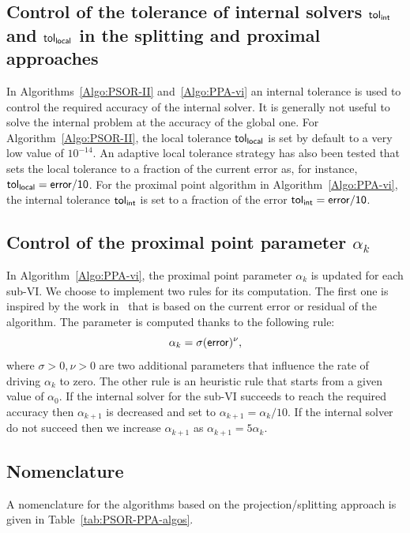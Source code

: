 \subsection{Control of the tolerance of internal solvers $\sf tol_{{int}}$ and $\sf tol_{{local}}$ in the splitting and proximal approaches}
\label{Sec:NSGS-LocalTol}
In Algorithms~\ref{Algo:PSOR-II} and~\ref{Algo:PPA-vi} an internal tolerance is used to control the required accuracy of the internal solver. It is generally not useful to solve the internal problem at the accuracy of the global one. For Algorithm~\ref{Algo:PSOR-II}, the local tolerance  $\sf tol_{{local}}$ is  set by default to a very low value of $10^{-14}$. An adaptive local tolerance strategy has also been tested that sets the local tolerance to a fraction of the current error as, for instance, $\sf tol_{{local}}  = error/10$. For the proximal point algorithm in  Algorithm~\ref{Algo:PPA-vi},  the internal tolerance $\sf tol_{{int}}$ is set to a fraction of the error $\sf  tol_{{int}} = error/10$. 

\subsection{Control of the proximal point parameter $\alpha_k$}

In Algorithm~\ref{Algo:PPA-vi}, the proximal point parameter $\alpha_k$ is updated for each sub-VI. We choose to implement two rules for its computation. The first one is inspired by the work in~\citep{Hager.Zhang_COA2008} that is based on the current error or residual of the algorithm. The parameter is computed thanks to the following rule:
\begin{equation}
  \label{eq:1}
  \alpha_k = \sigma ({\sf error})^\nu,
\end{equation}
where $\sigma >0, \nu >0$ are two additional parameters that influence the rate of driving $\alpha_k$ to zero. The other rule is an heuristic rule that starts from a given value of $\alpha_0$. If the internal solver for the sub-VI succeeds to reach the required accuracy then $\alpha_{k+1}$ is decreased and set to $\alpha_{k+1} = \alpha_k/10$. If the internal solver do not succeed then we increase $\alpha_{k+1}$ as $\alpha_{k+1} = 5 \alpha_k$.


\subsection{Nomenclature}
A nomenclature for the algorithms based on the projection/splitting approach is given in Table~\ref{tab:PSOR-PPA-algos}.


